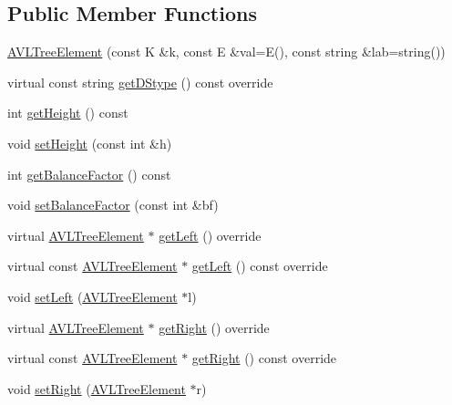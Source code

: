 \subsection*{Public Member Functions}
\begin{DoxyCompactItemize}
\item 
\mbox{\hyperlink{classbridges_1_1_a_v_l_tree_element_a24d1dfb65f00f2fef96a57a3f869a263}{A\+V\+L\+Tree\+Element}} (const K \&k, const E \&val=E(), const string \&lab=string())
\item 
virtual const string \mbox{\hyperlink{classbridges_1_1_a_v_l_tree_element_a24c005f8e07a7a2682225cead3b7e364}{get\+D\+Stype}} () const override
\item 
int \mbox{\hyperlink{classbridges_1_1_a_v_l_tree_element_ace72b436fa14db4f7844cc6e30b87aa7}{get\+Height}} () const
\item 
void \mbox{\hyperlink{classbridges_1_1_a_v_l_tree_element_acbf2a222b954e5d9221b109634822f96}{set\+Height}} (const int \&h)
\item 
int \mbox{\hyperlink{classbridges_1_1_a_v_l_tree_element_aa37dc257fbc32ad8bfdd885bf98d3a8d}{get\+Balance\+Factor}} () const
\item 
void \mbox{\hyperlink{classbridges_1_1_a_v_l_tree_element_a076ec482874d248764348e62dd4652d2}{set\+Balance\+Factor}} (const int \&bf)
\item 
virtual \mbox{\hyperlink{classbridges_1_1_a_v_l_tree_element}{A\+V\+L\+Tree\+Element}} $\ast$ \mbox{\hyperlink{classbridges_1_1_a_v_l_tree_element_a7b5d05660da127f5f6164120d9846d90}{get\+Left}} () override
\item 
virtual const \mbox{\hyperlink{classbridges_1_1_a_v_l_tree_element}{A\+V\+L\+Tree\+Element}} $\ast$ \mbox{\hyperlink{classbridges_1_1_a_v_l_tree_element_a61e075db5414b7bd6f52d657401acda3}{get\+Left}} () const override
\item 
void \mbox{\hyperlink{classbridges_1_1_a_v_l_tree_element_a19980980e712d10a1158272ecc44ef10}{set\+Left}} (\mbox{\hyperlink{classbridges_1_1_a_v_l_tree_element}{A\+V\+L\+Tree\+Element}} $\ast$l)
\item 
virtual \mbox{\hyperlink{classbridges_1_1_a_v_l_tree_element}{A\+V\+L\+Tree\+Element}} $\ast$ \mbox{\hyperlink{classbridges_1_1_a_v_l_tree_element_a909b46ebf3e8c6a3434762a1f01499e2}{get\+Right}} () override
\item 
virtual const \mbox{\hyperlink{classbridges_1_1_a_v_l_tree_element}{A\+V\+L\+Tree\+Element}} $\ast$ \mbox{\hyperlink{classbridges_1_1_a_v_l_tree_element_a2f6fd127f3a04fcc5be60299b7d98f12}{get\+Right}} () const override
\item 
void \mbox{\hyperlink{classbridges_1_1_a_v_l_tree_element_a2e048abe8e79232effa92dfdbeac4a54}{set\+Right}} (\mbox{\hyperlink{classbridges_1_1_a_v_l_tree_element}{A\+V\+L\+Tree\+Element}} $\ast$r)
\end{DoxyCompactItemize}
